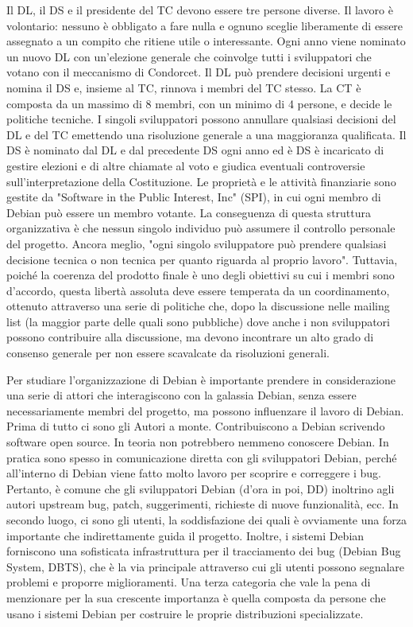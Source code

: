 \documentclass[a4paper,12pt,titlepage,oneside]{book}
\begin{document}
    Il DL, il DS e il presidente del TC devono essere tre persone diverse. Il lavoro è volontario: nessuno è obbligato a fare nulla e ognuno sceglie liberamente di essere assegnato a un 
    compito che ritiene utile o interessante. Ogni anno viene nominato un nuovo DL con un'elezione generale che coinvolge tutti i sviluppatori che votano con il meccanismo di Condorcet.
    Il DL può prendere decisioni urgenti e nomina il DS e, insieme al TC, rinnova i membri del TC stesso. La CT è composta da un massimo di 8 membri, con un minimo di 4 persone, e decide le
    politiche tecniche. I singoli sviluppatori possono annullare qualsiasi decisioni del DL e del TC emettendo una risoluzione generale a una maggioranza qualificata. 
    Il DS è nominato dal DL e dal precedente DS ogni anno ed è DS è incaricato di gestire elezioni e di altre chiamate al voto e giudica eventuali controversie sull'interpretazione della Costituzione. 
    Le proprietà e le attività finanziarie sono gestite da "Software in the Public Interest, Inc" (SPI), in cui ogni membro di Debian può essere un membro votante.
    La conseguenza di questa struttura organizzativa è che nessun singolo individuo può assumere il controllo personale del progetto. Ancora meglio, "ogni singolo sviluppatore può
    prendere qualsiasi decisione tecnica o non tecnica per quanto riguarda al proprio lavoro". Tuttavia, poiché la coerenza del prodotto finale è uno degli obiettivi
    su cui i membri sono d'accordo, questa libertà assoluta deve essere temperata da un coordinamento, ottenuto attraverso una serie di politiche che, dopo la
    discussione nelle mailing list (la maggior parte delle quali sono pubbliche) dove anche i non sviluppatori possono contribuire alla discussione, ma devono
    incontrare un alto grado di consenso generale per non essere scavalcate da risoluzioni generali. 
    
    Per studiare l'organizzazione di Debian è importante prendere in considerazione una serie di attori che interagiscono con la galassia Debian, senza essere necessariamente membri del progetto, ma possono 
    influenzare il lavoro di Debian. Prima di tutto ci sono gli Autori a monte. Contribuiscono a Debian scrivendo software open source. In teoria non potrebbero nemmeno conoscere Debian. In pratica sono
    spesso in comunicazione diretta con gli sviluppatori Debian, perché all'interno di Debian viene fatto molto lavoro per scoprire e correggere i bug. Pertanto, è comune che gli sviluppatori Debian (d'ora in poi, DD)
    inoltrino agli autori upstream bug, patch, suggerimenti, richieste di nuove funzionalità, ecc.
    In secondo luogo, ci sono gli utenti, la soddisfazione dei quali è ovviamente una forza importante che indirettamente guida il progetto. Inoltre, i sistemi Debian forniscono una
    sofisticata infrastruttura per il tracciamento dei bug (Debian Bug System, DBTS), che è la via principale attraverso cui gli utenti possono segnalare problemi e proporre
    miglioramenti. Una terza categoria che vale la pena di menzionare per la sua
    crescente importanza è quella composta da persone che usano i sistemi Debian per costruire le proprie distribuzioni specializzate.
   
\end{document}
